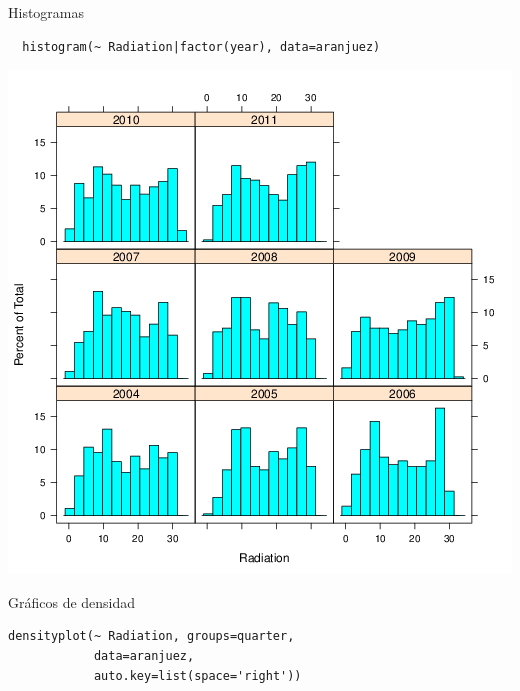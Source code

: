 \documentclass[xcolor={usenames,svgnames,dvipsnames}]{beamer}
\begin{document}
\begin{frame}[fragile,label=sec-3-44]{Histogramas}
 \lstset{language=R,label= ,caption= ,numbers=none}
\begin{lstlisting}
  histogram(~ Radiation|factor(year), data=aranjuez)
\end{lstlisting}
\end{frame}

\begin{frame}[label=sec-3-45]{}
\includegraphics[width=.9\linewidth]{figs/histogram.png}
\end{frame}

\begin{frame}[fragile,label=sec-3-46]{Gráficos de densidad}
 \lstset{language=R,label= ,caption= ,numbers=none}
\begin{lstlisting}
densityplot(~ Radiation, groups=quarter,
            data=aranjuez,
            auto.key=list(space='right'))
\end{lstlisting}
\end{frame}
\end{document}
